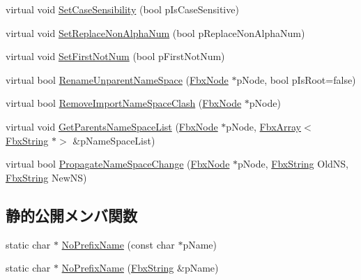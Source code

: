 \begin{DoxyCompactItemize}
virtual void \hyperlink{class_fbx_renaming_strategy_a4ffe010b34e4040da2525db5fcaa4f45}{Set\+Case\+Sensibility} (bool p\+Is\+Case\+Sensitive)
\item 
virtual void \hyperlink{class_fbx_renaming_strategy_a64ccadd7f74e58d706548e6333721558}{Set\+Replace\+Non\+Alpha\+Num} (bool p\+Replace\+Non\+Alpha\+Num)
\item 
virtual void \hyperlink{class_fbx_renaming_strategy_a0786472d7eeef7b817eb8dacbaebafa6}{Set\+First\+Not\+Num} (bool p\+First\+Not\+Num)
\item 
virtual bool \hyperlink{class_fbx_renaming_strategy_abc91bd710f488bc42bac3e19b1b3eda2}{Rename\+Unparent\+Name\+Space} (\hyperlink{class_fbx_node}{Fbx\+Node} $\ast$p\+Node, bool p\+Is\+Root=false)
\item 
virtual bool \hyperlink{class_fbx_renaming_strategy_a1c8eccfa6eb14363e6e9295033e66e7c}{Remove\+Import\+Name\+Space\+Clash} (\hyperlink{class_fbx_node}{Fbx\+Node} $\ast$p\+Node)
\item 
virtual void \hyperlink{class_fbx_renaming_strategy_a4908d6495b3749742c7b23c85f35ad93}{Get\+Parents\+Name\+Space\+List} (\hyperlink{class_fbx_node}{Fbx\+Node} $\ast$p\+Node, \hyperlink{class_fbx_array}{Fbx\+Array}$<$ \hyperlink{class_fbx_string}{Fbx\+String} $\ast$$>$ \&p\+Name\+Space\+List)
\item 
virtual bool \hyperlink{class_fbx_renaming_strategy_a7d9e1c1bd9ffb573a54cafbfe138f837}{Propagate\+Name\+Space\+Change} (\hyperlink{class_fbx_node}{Fbx\+Node} $\ast$p\+Node, \hyperlink{class_fbx_string}{Fbx\+String} Old\+NS, \hyperlink{class_fbx_string}{Fbx\+String} New\+NS)
\end{DoxyCompactItemize}
\subsection*{静的公開メンバ関数}
\begin{DoxyCompactItemize}
\item 
static char $\ast$ \hyperlink{class_fbx_renaming_strategy_a74785822c27882421fe5e827c3347786}{No\+Prefix\+Name} (const char $\ast$p\+Name)
\item 
static char $\ast$ \hyperlink{class_fbx_renaming_strategy_a82d239d3b92ac672fd6ea71617a5c8e1}{No\+Prefix\+Name} (\hyperlink{class_fbx_string}{Fbx\+String} \&p\+Name)
\end{DoxyCompactItemize}
